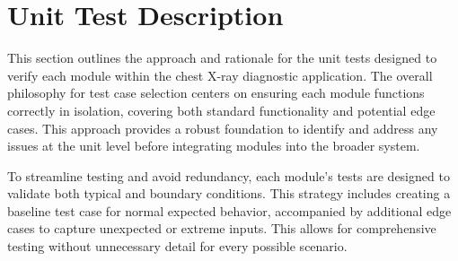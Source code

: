 \documentclass[12pt, titlepage]{article}
\begin{document}
\newcommand{\SUCCESSRATE}{80\%}
\newcommand{\CONFIDENCERATING}{4}





\section{Unit Test Description}

This section outlines the approach and rationale for the unit tests designed to verify each module within the chest X-ray diagnostic application. The overall philosophy for test case selection centers on ensuring each module functions correctly in isolation, covering both standard functionality and potential edge cases. This approach provides a robust foundation to identify and address any issues at the unit level before integrating modules into the broader system.

To streamline testing and avoid redundancy, each module's tests are designed to validate both typical and boundary conditions. This strategy includes creating a baseline test case for normal expected behavior, accompanied by additional edge cases to capture unexpected or extreme inputs. This allows for comprehensive testing without unnecessary detail for every possible scenario.
\end{document}
